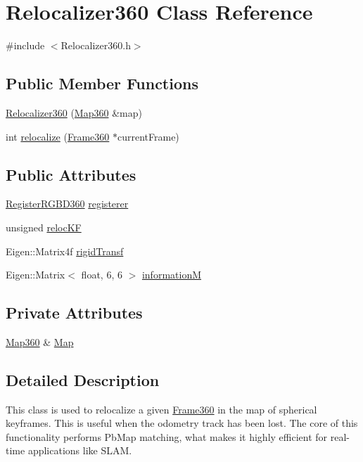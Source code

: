 \hypertarget{classRelocalizer360}{\section{Relocalizer360 Class Reference}
\label{classRelocalizer360}
}


{\ttfamily \#include $<$Relocalizer360.\-h$>$}

\subsection*{Public Member Functions}
\begin{DoxyCompactItemize}
\item 
\hyperlink{classRelocalizer360_a0bf1623c3c27d05525cc7bb04e776385}{Relocalizer360} (\hyperlink{structMap360}{Map360} \&map)
\item 
int \hyperlink{classRelocalizer360_a522f6e3c5c005d185dbb0b5984e1a682}{relocalize} (\hyperlink{classFrame360}{Frame360} $\ast$current\-Frame)
\end{DoxyCompactItemize}
\subsection*{Public Attributes}
\begin{DoxyCompactItemize}
\item 
\hyperlink{classRegisterRGBD360}{Register\-R\-G\-B\-D360} \hyperlink{classRelocalizer360_ae782e8bb7b638e264247afdc754c1891}{registerer}
\item 
unsigned \hyperlink{classRelocalizer360_a7391b203d219d35f74f5566cd5b3a154}{reloc\-K\-F}
\item 
Eigen\-::\-Matrix4f \hyperlink{classRelocalizer360_a4c7afb62e3812f6aecdf64f8f3790084}{rigid\-Transf}
\item 
Eigen\-::\-Matrix$<$ float, 6, 6 $>$ \hyperlink{classRelocalizer360_ae403c7df20c063687f14726ea1fa9e22}{information\-M}
\end{DoxyCompactItemize}
\subsection*{Private Attributes}
\begin{DoxyCompactItemize}
\item 
\hyperlink{structMap360}{Map360} \& \hyperlink{classRelocalizer360_a537a5a4228c0e1f03185f58caf7e4123}{Map}
\end{DoxyCompactItemize}


\subsection{Detailed Description}
This class is used to relocalize a given \hyperlink{classFrame360}{Frame360} in the map of spherical keyframes. This is useful when the odometry track has been lost. The core of this functionality performs Pb\-Map matching, what makes it highly efficient for real-\/time applications like S\-L\-A\-M. 

